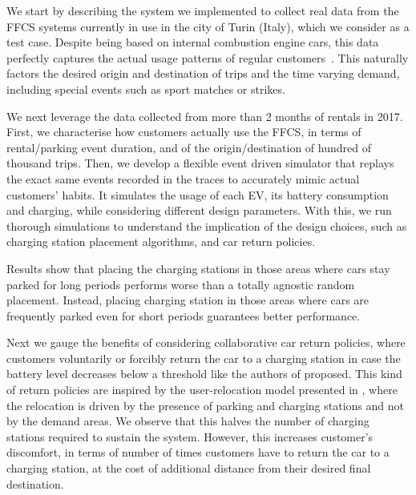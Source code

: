 We start by describing the system we implemented to collect real data from the FFCS systems currently in use in the city of Turin  (Italy), which we consider as a test case. Despite being based on internal combustion engine cars, this data perfectly captures the actual usage patterns of regular customers~\cite{UMAP}. This naturally factors the desired origin and destination of trips and the time varying demand, including special events such as sport matches or strikes.

We next leverage the data collected from more than 2 months of rentals in 2017. First, we characterise how customers actually use the FFCS, in terms of rental/parking event duration, and of the origin/destination of hundred of thousand trips.
Then, we develop a flexible event driven simulator that replays the exact same events recorded in the traces to accurately mimic actual customers' habits. It simulates the usage of each EV, its battery consumption and charging, while considering different design parameters. With this, we run thorough simulations to understand the implication of the design choices, such as charging station placement algorithms, and car return policies.

Results show that placing the charging stations in those areas where cars stay parked for long periods performs worse than a totally agnostic random placement. Instead, placing charging station in those areas where cars are frequently parked even for short periods guarantees  better performance.

Next we gauge the benefits of considering collaborative car return policies, where customers voluntarily or forcibly return the car to a charging station in case the battery level decreases below a  threshold like the authors of \cite{2_FlathIlgWeinhardt_2012} proposed. This kind of return policies are inspired by the user-relocation model presented in \cite{1_BrendelBrennecke_2015, 6_BrendelLichtenberg_2017,7_BrendelRockenkamm_2015,8_Wagner2015DataAF}, where the relocation is driven by the presence of parking and charging stations and not by the demand areas.
We observe that this halves the number of charging stations required to sustain the system. However, this increases customer's discomfort, in terms of number of times customers have to return the car to a charging station, at the cost of additional distance from their desired final destination. 

